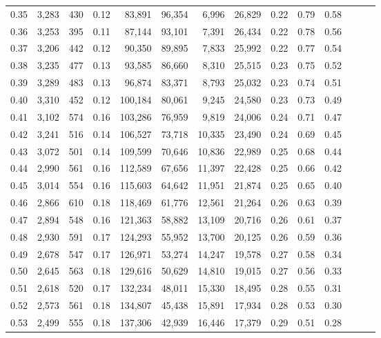 \begin{tabular}{rrrrrrrrrrrrrr}
0.35 &  3,283 &  430 &  0.12 &   83,891 &   96,354 &   6,996 &  26,829 &  0.22 &  0.79 &      0.58 \\
0.36 &  3,253 &  395 &  0.11 &   87,144 &   93,101 &   7,391 &  26,434 &  0.22 &  0.78 &      0.56 \\
0.37 &  3,206 &  442 &  0.12 &   90,350 &   89,895 &   7,833 &  25,992 &  0.22 &  0.77 &      0.54 \\
0.38 &  3,235 &  477 &  0.13 &   93,585 &   86,660 &   8,310 &  25,515 &  0.23 &  0.75 &      0.52 \\
0.39 &  3,289 &  483 &  0.13 &   96,874 &   83,371 &   8,793 &  25,032 &  0.23 &  0.74 &      0.51 \\
0.40 &  3,310 &  452 &  0.12 &  100,184 &   80,061 &   9,245 &  24,580 &  0.23 &  0.73 &      0.49 \\
0.41 &  3,102 &  574 &  0.16 &  103,286 &   76,959 &   9,819 &  24,006 &  0.24 &  0.71 &      0.47 \\
0.42 &  3,241 &  516 &  0.14 &  106,527 &   73,718 &  10,335 &  23,490 &  0.24 &  0.69 &      0.45 \\
0.43 &  3,072 &  501 &  0.14 &  109,599 &   70,646 &  10,836 &  22,989 &  0.25 &  0.68 &      0.44 \\
0.44 &  2,990 &  561 &  0.16 &  112,589 &   67,656 &  11,397 &  22,428 &  0.25 &  0.66 &      0.42 \\
0.45 &  3,014 &  554 &  0.16 &  115,603 &   64,642 &  11,951 &  21,874 &  0.25 &  0.65 &      0.40 \\
0.46 &  2,866 &  610 &  0.18 &  118,469 &   61,776 &  12,561 &  21,264 &  0.26 &  0.63 &      0.39 \\
0.47 &  2,894 &  548 &  0.16 &  121,363 &   58,882 &  13,109 &  20,716 &  0.26 &  0.61 &      0.37 \\
0.48 &  2,930 &  591 &  0.17 &  124,293 &   55,952 &  13,700 &  20,125 &  0.26 &  0.59 &      0.36 \\
0.49 &  2,678 &  547 &  0.17 &  126,971 &   53,274 &  14,247 &  19,578 &  0.27 &  0.58 &      0.34 \\
0.50 &  2,645 &  563 &  0.18 &  129,616 &   50,629 &  14,810 &  19,015 &  0.27 &  0.56 &      0.33 \\
0.51 &  2,618 &  520 &  0.17 &  132,234 &   48,011 &  15,330 &  18,495 &  0.28 &  0.55 &      0.31 \\
0.52 &  2,573 &  561 &  0.18 &  134,807 &   45,438 &  15,891 &  17,934 &  0.28 &  0.53 &      0.30 \\
0.53 &  2,499 &  555 &  0.18 &  137,306 &   42,939 &  16,446 &  17,379 &  0.29 &  0.51 &      0.28 \\

\end{tabular}
